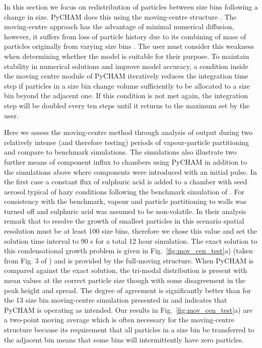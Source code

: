 \documentclass[gmd, manuscript]{copernicus}
\begin{document}
In this section we focus on redistribution of particles between size bins following a change in size.  PyCHAM does this using the moving-centre structure \citep{Jacobson2005}.  The moving-centre approach has the advantage of minimal numerical diffusion, however, it suffers from loss of particle history due to its combining of mass of particles originally from varying size bins \citep{Zhang1999}.  The user must consider this weakness when determining whether the model is suitable for their purpose.  To maintain stability in numerical solutions and improve model accuracy, a condition inside the moving centre module of PyCHAM iteratively reduces the integration time step if particles in a size bin change volume sufficiently to be allocated to a size bin beyond the adjacent one.  If this condition is not met again, the integration step will be doubled every ten steps until it returns to the maximum set by the user.

Here we assess the moving-centre method through analysis of output during two relatively intense (and therefore testing) periods of vapour-particle partitioning and compare to benchmark simulations.  The simulations also illustrate two further means of component influx to chambers using PyCHAM in addition to the simulations above where components were introduced with an initial pulse.  In the first case a constant flux of sulphuric acid is added to a chamber with seed aerosol typical of hazy conditions following the benchmark simulation of \citet{Zhang1999}.  For consistency with the benchmark, vapour and particle partitioning to walls was turned off and sulphuric acid was assumed to be non-volatile.  In their analysis \citet{Zhang1999} remark that to resolve the growth of smallest particles in this scenario spatial resolution must be at least 100 size bins, therefore we chose this value and set the solution time interval to 90 s for a total 12 hour simulation.  The exact solution to this condensational growth problem is given in Fig.~\ref{fig:mov_cen_test}a) (taken from Fig. 3 of \citet{Zhang1999}) and is provided by the full-moving structure.  When PyCHAM is compared against the exact solution, the tri-modal distribution is present with mean values at the correct particle size though with some disagreement in the peak height and spread.  The degree of agreement is significantly better than for the 13 size bin moving-centre simulation presented in \citet{Zhang1999} and indicates that PyCHAM is operating as intended.  Our results in Fig.~\ref{fig:mov_cen_test}a) are a two-point moving average which is often necessary for the moving-centre structure because its requirement that all particles in a size bin be transferred to the adjacent bin means that some bins will intermittently have zero particles.
\end{document}
